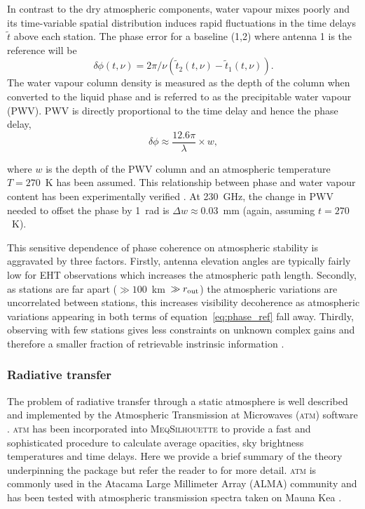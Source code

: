 In contrast to the dry atmospheric components, water vapour mixes poorly and its time-variable spatial distribution induces rapid fluctuations in the time delays $\tilde{t}$ above each station. The phase error for a baseline (1,2) where antenna 1 is the reference will be
\begin{equation}\label{eq:phase_ref}
\delta \phi(t, \nu) = 2\pi/\nu(\tilde{t}_2(t, \nu) - \tilde{t}_1(t, \nu)).
\end{equation}
The water vapour column density is measured as the depth of the column when converted to the liquid phase and is referred to as the precipitable water vapour (PWV). PWV is directly proportional to the time delay and hence the phase delay, 
\begin{equation}
\delta\phi \approx \frac{12.6\pi}{\lambda} \times w, 
\end{equation}\label{eq:phi-pwv}

\noindent where $w$ is the depth of the PWV column \citep*{Carilli_1999} and an atmospheric temperature $T=270$~K has been assumed. This relationship between phase and water vapour content has been experimentally verified \citep{hogg_1981}. At 230~GHz, the change in PWV needed to offset the phase by 1~rad is $\Delta w\approx0.03$~mm (again, assuming $t=270$~K). 

This sensitive dependence of phase coherence on atmospheric stability is aggravated by three factors. Firstly, antenna elevation angles are typically fairly low for EHT observations which increases the atmospheric path length. Secondly, as stations are far apart ($\gg 100$~km~$\gg r_{\rm out}$) the atmospheric variations are uncorrelated between stations, this increases visibility decoherence as atmospheric variations appearing in both terms of equation~\ref{eq:phase_ref} fall away. Thirdly, observing with few stations gives less constraints on unknown complex gains and therefore a smaller fraction of retrievable instrinsic information \citep{Thompson_2001}.


\subsubsection{Radiative transfer}\label{sec:atm_theory}

The problem of radiative transfer through a static atmosphere is well described and implemented by the Atmospheric Transmission at Microwaves (\textsc{atm}) software \citep{Pardo_2001}. \textsc{atm} has been incorporated into \textsc{MeqSilhouette} to provide a fast and sophisticated procedure to calculate average opacities, sky brightness temperatures and time delays. Here we provide a brief summary of the theory underpinning the package but refer the reader to \citet{Pardo_2001} for more detail. \textsc{atm} is commonly used in the Atacama Large Millimeter Array (ALMA) community \citep[e.g.][]{Curtis_2009,Nikolic_2013} and has been tested with atmospheric transmission spectra taken on Mauna Kea \citep{Serabyn_1998}.

